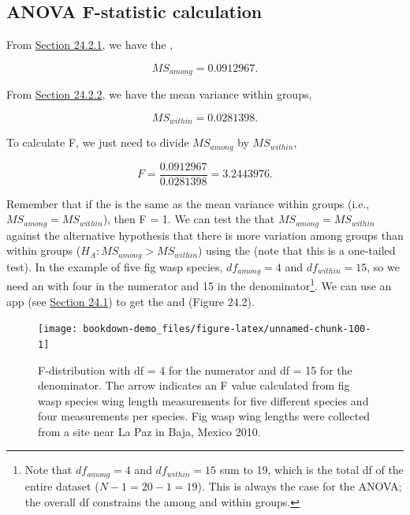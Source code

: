 \documentclass[
  openany]{krantz}
\begin{document}
\hypertarget{anova-f-statistic-calculation}{%
\subsection{ANOVA F-statistic calculation}\label{anova-f-statistic-calculation}}

From \protect\hyperlink{anova-mean-variance-among-groups}{Section 24.2.1}, we have the ,

\[MS_{among} = 0.0912967.\]

From \protect\hyperlink{anova-mean-variance-among-groups}{Section 24.2.2}, we have the mean variance within groups,

\[MS_{within} = 0.0281398.\]

To calculate F, we just need to divide \(MS_{among}\) by \(MS_{within}\),

\[F = \frac{0.0912967}{0.0281398} = 3.2443976.\]

Remember that if the  is the same as the mean variance within groups (i.e., \(MS_{among} = MS_{within}\)), then F = 1.
We can test the  that \(MS_{among} = MS_{within}\) against the alternative hypothesis that there is more variation among groups than within groups (\(H_{A}: MS_{among} > MS_{within}\)) using the  (note that this is a one-tailed test).
In the example of five fig wasp species, \(df_{among} = 4\) and \(df_{within} = 15\),
so we need an  with four  in the numerator and 15  in the denominator\footnote{Note that \(df_{among} = 4\) and \(df_{within} = 15\) sum to 19, which is the total df of the entire dataset (\(N - 1 = 20 - 1 = 19\)). This is always the case for the ANOVA; the overall df constrains the  among and within groups.}.
We can use an  app (see \protect\hyperlink{f-distribution}{Section 24.1}) to get the  and  (Figure 24.2).

\begin{figure}
\texttt{[image: bookdown-demo\_files/figure-latex/unnamed-chunk-100-1]} \caption{F-distribution with df = 4 for the numerator and df = 15 for the denominator. The arrow indicates an F value calculated from fig wasp species wing length measurements for five different species and four measurements per species. Fig wasp wing lengths were collected from a site near La Paz in Baja, Mexico 2010.}\label{fig:unnamed-chunk-100}
\end{figure}
\end{document}
